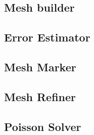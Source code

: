 \subsection{Mesh builder}



\newpage
\subsection{Error Estimator}



\newpage
\subsection{Mesh Marker}



\newpage
\subsection{Mesh Refiner}



\newpage
\subsection{Poisson Solver}

